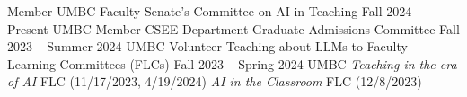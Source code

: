 {\color{black}\fontsize{12pt}{1em}} 

\begin{cventries}
\cventry
    {Member}
    {UMBC Faculty Senate's Committee on AI in Teaching}
    {Fall 2024 -- Present}
    {UMBC}
    {}  
\cventry
    {Member}
    {CSEE Department Graduate Admissions Committee}
    {Fall 2023 -- Summer 2024}
    {UMBC}
    {}    
\cventry
    {Volunteer}
    {Teaching about LLMs to Faculty Learning Committees (FLCs)}
    {Fall 2023 -- Spring 2024}
    {UMBC}
    {\textit{Teaching in the era of AI} FLC (11/17/2023, 4/19/2024)\newline
    \textit{AI in the Classroom} FLC (12/8/2023)}   
\end{cventries}


